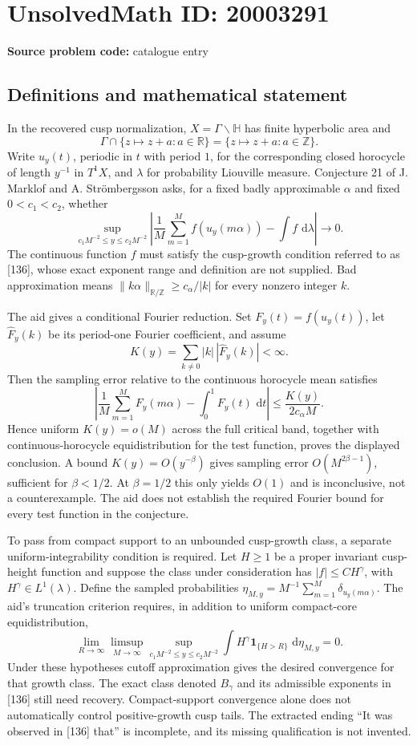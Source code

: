\documentclass[11pt]{article}
\newcommand{\Z}{\mathbb{Z}}
\newcommand{\R}{\mathbb{R}}
\newcommand{\dd}{\,\mathrm{d}}
\begin{document}
\section*{UnsolvedMath ID: 20003291}
\textbf{Source problem code:} catalogue entry
\subsection{Definitions and mathematical statement}
In the recovered cusp normalization, $X=\Gamma\backslash\mathbb H$ has finite hyperbolic area and
\[
\Gamma\cap\{z\mapsto z+a:a\in\R\}=\{z\mapsto z+a:a\in\Z\}.
\]
Write $u_y(t)$, periodic in $t$ with period $1$, for the corresponding closed horocycle of length $y^{-1}$ in $T^1X$, and $\lambda$ for probability Liouville measure. Conjecture 21 of J. Marklof and A. Str\"ombergsson asks, for a fixed badly approximable $\alpha$ and fixed $0<c_1<c_2$, whether
\[
\sup_{c_1M^{-2}\leq y\leq c_2M^{-2}}
\left|\frac1M\sum_{m=1}^M f(u_y(m\alpha))-\int f\,\dd\lambda\right|\longrightarrow0.
\]
The continuous function $f$ must satisfy the cusp-growth condition referred to as [136], whose exact exponent range and definition are not supplied. Bad approximation means $\|k\alpha\|_{\R/\Z}\geq c_\alpha/|k|$ for every nonzero integer $k$.

The aid gives a conditional Fourier reduction. Set $F_y(t)=f(u_y(t))$, let $\widehat F_y(k)$ be its period-one Fourier coefficient, and assume
\[
K(y)=\sum_{k\ne0}|k|\,|\widehat F_y(k)|<\infty.
\]
Then the sampling error relative to the continuous horocycle mean satisfies
\[
\left|\frac1M\sum_{m=1}^M F_y(m\alpha)-\int_0^1F_y(t)\,\dd t\right|
\leq\frac{K(y)}{2c_\alpha M}.
\]
Hence uniform $K(y)=o(M)$ across the full critical band, together with continuous-horocycle equidistribution for the test function, proves the displayed conclusion. A bound $K(y)=O(y^{-\beta})$ gives sampling error $O(M^{2\beta-1})$, sufficient for $\beta<1/2$. At $\beta=1/2$ this only yields $O(1)$ and is inconclusive, not a counterexample. The aid does not establish the required Fourier bound for every test function in the conjecture.

To pass from compact support to an unbounded cusp-growth class, a separate uniform-integrability condition is required. Let $H\geq1$ be a proper invariant cusp-height function and suppose the class under consideration has $|f|\leq C H^\gamma$, with $H^\gamma\in L^1(\lambda)$. Define the sampled probabilities $\eta_{M,y}=M^{-1}\sum_{m=1}^M\delta_{u_y(m\alpha)}$. The aid's truncation criterion requires, in addition to uniform compact-core equidistribution,
\[
\lim_{R\to\infty}\limsup_{M\to\infty}
\sup_{c_1M^{-2}\leq y\leq c_2M^{-2}}
\int H^\gamma\mathbf1_{\{H>R\}}\,\dd\eta_{M,y}=0.
\]
Under these hypotheses cutoff approximation gives the desired convergence for that growth class. The exact class denoted $B_\gamma$ and its admissible exponents in [136] still need recovery. Compact-support convergence alone does not automatically control positive-growth cusp tails. The extracted ending ``It was observed in [136] that'' is incomplete, and its missing qualification is not invented.
\end{document}
